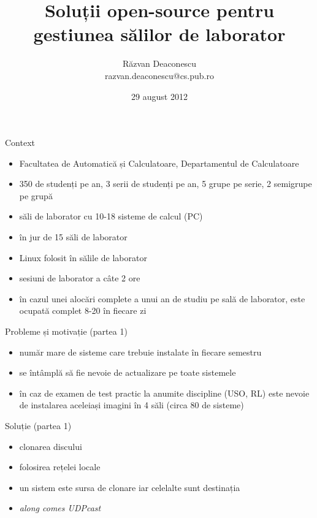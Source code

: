 \documentclass{beamer}
\title[Gestiunea laboratorului]{Soluții open-source pentru gestiunea sălilor
de laborator}
\institute{Informatica la Castel (Macea, Arad)}
\author[Răzvan Deaconescu]{Răzvan Deaconescu \\
razvan.deaconescu@cs.pub.ro}
\date{29 august 2012}
\begin{document}
\frame{\titlepage}

\begin{frame}{Context}
  \begin{itemize}
    \item Facultatea de Automatică și Calculatoare, Departamentul de
      Calculatoare
    \item 350 de studenți pe an, 3 serii de studenți pe an, 5 grupe pe serie,
      2 semigrupe pe grupă
    \item săli de laborator cu 10-18 sisteme de calcul (PC)
    \item în jur de 15 săli de laborator
    \item Linux folosit în sălile de laborator
    \item sesiuni de laborator a câte 2 ore
    \item în cazul unei alocări complete a unui an de studiu pe sală de
      laborator, este ocupată complet 8-20 în fiecare zi
  \end{itemize}
\end{frame}

\begin{frame}{Probleme și motivație (partea 1)}
  \begin{itemize}
    \item număr mare de sisteme care trebuie instalate în fiecare semestru
    \item se întâmplă să fie nevoie de actualizare pe toate sistemele
    \item în caz de examen de test practic la anumite discipline (USO, RL)
      este nevoie de instalarea aceleiași imagini în 4 săli (circa 80 de
      sisteme)
  \end{itemize}
\end{frame}

\begin{frame}{Soluție (partea 1)}
  \begin{itemize}
    \item clonarea discului
    \item folosirea rețelei locale
    \item un sistem este sursa de clonare iar celelalte sunt destinația
    \item \textit{along comes UDPcast}
  \end{itemize}
\end{frame}
\end{document}
